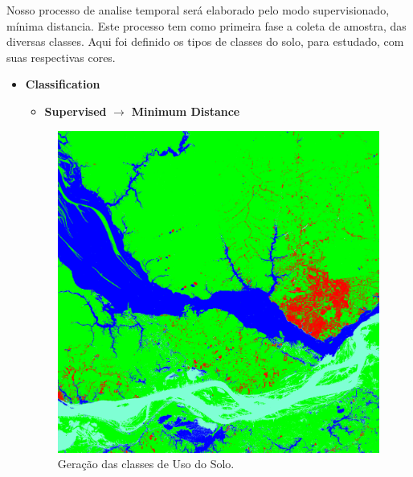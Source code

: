 \hspace{1.5cm}
Nosso processo de analise temporal será elaborado pelo modo supervisionado, mínima distancia. Este processo tem como primeira fase a coleta de amostra, das diversas classes. Aqui foi definido os tipos de classes do solo, para estudado, com suas respectivas cores.
\begin{itemize}
\item \textbf{Classification}
\begin{itemize}
\item \textbf{Supervised} $\rightarrow$ \textbf{Minimum Distance}\\
\end{itemize}
\begin{figure}[!htpb]
        \centering
        \includegraphics[scale =0.1]{imagens/1999_banda1a7_Class_MinDist.png}
        \caption{Geração das classes de Uso do Solo.}
        \label{1999}
        \centering

\end{figure}
\end{itemize}
